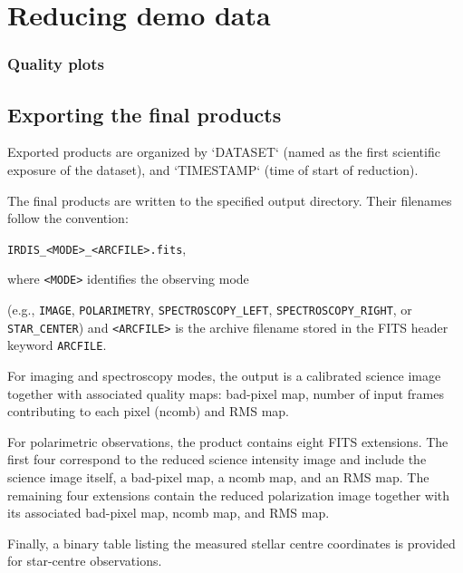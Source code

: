 
\section{Reducing demo data}
\label{sec:reducing_demo_data}



 
\subsubsection{Quality plots}


\subsection{Exporting the final products}
\label{sec:export_final_products}




\clearpage
 
Exported products are organized by `DATASET` (named as the first scientific exposure of the dataset), and `TIMESTAMP` (time of start of reduction). 

The final products are written to the specified output directory. Their filenames follow the convention:

\texttt{IRDIS\_<MODE>\_<ARCFILE>.fits}, 

where \texttt{<MODE>} identifies the observing mode 

(e.g., \texttt{IMAGE}, \texttt{POLARIMETRY}, \texttt{SPECTROSCOPY\_LEFT}, \texttt{SPECTROSCOPY\_RIGHT}, or \texttt{STAR\_CENTER}) and \texttt{<ARCFILE>} is the archive filename stored in the FITS header keyword \texttt{ARCFILE}.

For imaging and spectroscopy modes, the output is a calibrated science image together with associated quality maps: bad-pixel map, number of input frames contributing to each pixel (ncomb) and RMS map.

For polarimetric observations, the product contains eight FITS extensions. The first four correspond to the reduced science intensity image and include the science image itself, a bad-pixel map, a ncomb map, and an RMS map. The remaining four extensions contain the reduced polarization image together with its associated bad-pixel map, ncomb map, and RMS map.

Finally, a binary table listing the measured stellar centre coordinates is provided for star-centre observations.
